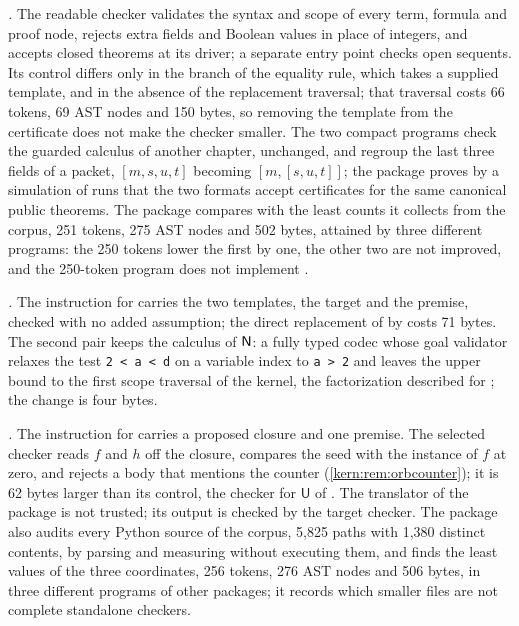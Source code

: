 \emph{.}  The readable checker validates the
syntax and scope of every term, formula and proof node, rejects extra fields
and Boolean values in place of integers, and accepts closed theorems at its
driver; a separate entry point checks open sequents.  Its control differs
only in the branch of the equality rule, which takes a supplied template,
and in the absence of the replacement traversal; that traversal costs 66
tokens, 69 AST nodes and 150 bytes, so removing the template from the
certificate does not make the checker smaller.  The two compact programs
check the guarded calculus of another chapter, unchanged, and regroup the
last three fields of a packet, $[m,s,u,t]$ becoming $[m,[s,u,t]]$; the
package proves by a simulation of runs that the two formats accept
certificates for the same canonical public theorems.  The package compares
with the least counts it collects from the corpus, 251 tokens, 275 AST nodes
and 502 bytes, attained by three different programs: the 250 tokens lower
the first by one, the other two are not improved, and the 250-token program
does not implement .

\emph{.}  The instruction for  carries
the two templates, the target and the premise, checked with no added
assumption; the direct replacement of  by  costs
71 bytes.  The second pair keeps the calculus of $\mathsf{N}$: a fully typed codec
whose goal validator relaxes the test \texttt{2 < a < d} on a variable index
to \texttt{a > 2} and leaves the upper bound to the first scope traversal of
the kernel, the factorization described for ; the change
is four bytes.

\emph{.}  The instruction for  carries a
proposed closure and one premise.  The selected checker reads $f$ and $h$
off the closure, compares the seed with the instance of $f$ at zero, and
rejects a body that mentions the counter (\cref{kern:rem:orbcounter}); it is
62 bytes larger than its control, the checker for $\mathsf{U}$ of
.  The translator of the package is not trusted; its
output is checked by the target checker.  The package also audits every
Python source of the corpus, 5,825 paths with 1,380 distinct contents, by
parsing and measuring without executing them, and finds the least values of
the three coordinates, 256 tokens, 276 AST nodes and 506 bytes, in three
different programs of other packages; it records which smaller files are
not complete standalone checkers.


